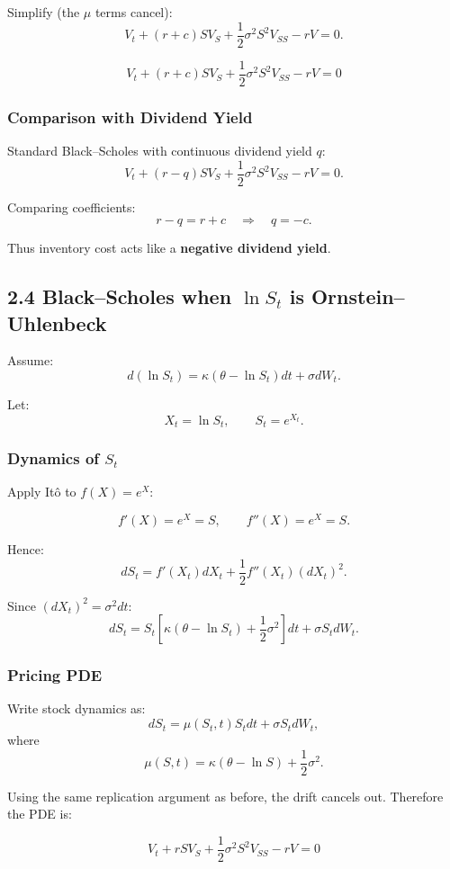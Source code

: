 \documentclass[11pt]{article}
\begin{document}
Simplify (the $\mu$ terms cancel):
\[
V_t+(r+c)SV_S+\frac12\sigma^2S^2V_{SS}-rV=0.
\]

\[
\boxed{
V_t+(r+c)SV_S+\frac12\sigma^2S^2V_{SS}-rV=0
}
\]

\subsubsection*{Comparison with Dividend Yield}

Standard Black--Scholes with continuous dividend yield $q$:
\[
V_t+(r-q)SV_S+\frac12\sigma^2S^2V_{SS}-rV=0.
\]

Comparing coefficients:
\[
r-q=r+c
\quad\Longrightarrow\quad
q=-c.
\]

Thus inventory cost acts like a \textbf{negative dividend yield}.


\subsection*{2.4 Black--Scholes when $\ln S_t$ is Ornstein--Uhlenbeck}

Assume:
\[
d(\ln S_t)=\kappa(\theta-\ln S_t)dt+\sigma dW_t.
\]

Let:
\[
X_t=\ln S_t,\qquad S_t=e^{X_t}.
\]

\subsubsection*{Dynamics of $S_t$}

Apply It\^o to $f(X)=e^X$:

\[
f'(X)=e^X=S,\qquad f''(X)=e^X=S.
\]

Hence:
\[
dS_t=f'(X_t)dX_t+\frac12f''(X_t)(dX_t)^2.
\]

Since $(dX_t)^2=\sigma^2dt$:
\[
dS_t
=
S_t\left[\kappa(\theta-\ln S_t)+\frac12\sigma^2\right]dt+\sigma S_t dW_t.
\]

\subsubsection*{Pricing PDE}

Write stock dynamics as:
\[
dS_t=\mu(S_t,t)S_tdt+\sigma S_tdW_t,
\]
where
\[
\mu(S,t)=\kappa(\theta-\ln S)+\frac12\sigma^2.
\]

Using the same replication argument as before, the drift cancels out. Therefore the PDE is:

\[
\boxed{
V_t+rSV_S+\frac12\sigma^2S^2V_{SS}-rV=0
}
\]
\end{document}
